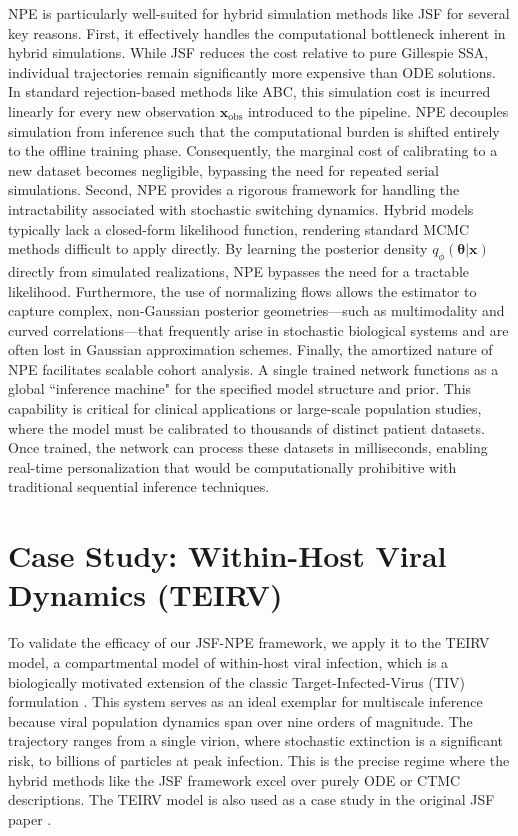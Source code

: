\documentclass{article}
\begin{document}
NPE is particularly well-suited for hybrid simulation methods like JSF for several key reasons. First, it effectively handles the computational bottleneck inherent in hybrid simulations. While JSF reduces the cost relative to pure Gillespie SSA, individual trajectories remain significantly more expensive than ODE solutions. In standard rejection-based methods like ABC, this simulation cost is incurred linearly for every new observation $\mathbf{x}_{\text{obs}}$ introduced to the pipeline. NPE decouples simulation from inference such that the computational burden is shifted entirely to the offline training phase. Consequently, the marginal cost of calibrating to a new dataset becomes negligible, bypassing the need for repeated serial simulations. Second, NPE provides a rigorous framework for handling the intractability associated with stochastic switching dynamics. Hybrid models typically lack a closed-form likelihood function, rendering standard MCMC methods difficult to apply directly. By learning the posterior density $q_\phi(\boldsymbol{\theta} | \mathbf{x})$ directly from simulated realizations, NPE bypasses the need for a tractable likelihood. Furthermore, the use of normalizing flows allows the estimator to capture complex, non-Gaussian posterior geometries—such as multimodality and curved correlations—that frequently arise in stochastic biological systems and are often lost in Gaussian approximation schemes. Finally, the amortized nature of NPE facilitates scalable cohort analysis. A single trained network functions as a global ``inference machine" for the specified model structure and prior. This capability is critical for clinical applications or large-scale population studies, where the model must be calibrated to thousands of distinct patient datasets. Once trained, the network can process these datasets in milliseconds, enabling real-time personalization that would be computationally prohibitive with traditional sequential inference techniques.

\section{Case Study: Within-Host Viral Dynamics (TEIRV)}\label{sec:TEIRV}

To validate the efficacy of our JSF-NPE framework, we apply it to the TEIRV model, a compartmental model of within-host viral infection, which is a biologically motivated extension of the classic Target-Infected-Virus (TIV) formulation \cite{Perelson2002}. This system serves as an ideal exemplar for multiscale inference because viral population dynamics span over nine orders of magnitude. The trajectory ranges from a single virion, where stochastic extinction is a significant risk, to billions of particles at peak infection. This is the precise regime where the hybrid methods like the JSF framework excel over purely ODE or CTMC descriptions. The TEIRV model is also used as a case study in the original JSF paper \cite{Germano2024JSF}.
\end{document}
